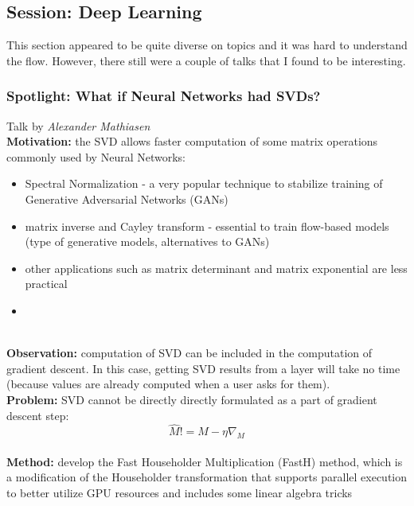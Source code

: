 \subsection{Session: Deep Learning}

This section appeared to be quite diverse on topics and it was hard to understand the flow. However, there still were a couple of talks that I found to be interesting.

\spacerule
\subsubsection{Spotlight: What if Neural Networks had SVDs? \cite{mathiasen2020neural}}

Talk by \textit{Alexander Mathiasen} \\

{\bf Motivation:} the SVD allows faster computation of some matrix operations commonly used by Neural Networks: 
\begin{itemize}
  \item Spectral Normalization \cite{MiyatoKKY18} - a very popular technique to stabilize training of Generative Adversarial Networks (GANs)
  \item matrix inverse and Cayley transform - essential to train flow-based models (type of generative models, alternatives to GANs) \cite{kingma2018glow}
  \item other applications such as matrix determinant and matrix exponential are less practical
  \item 
\end{itemize} \\

{\bf Observation:} computation of SVD can be included in the computation of gradient descent. 
In this case, getting SVD results from a layer will take no time (because values are already computed when a user asks for them). \\

{\bf Problem:} SVD cannot be directly directly formulated as a part of gradient descent step: 
\begin{equation} 
  \hat{M} != M - \eta\nabla_{M}
\end{equation} \\

{\bf Method:} develop the Fast Householder Multiplication (FastH) method, which is a modification of the Householder transformation that supports parallel execution to better utilize GPU resources and includes some linear algebra tricks \\

